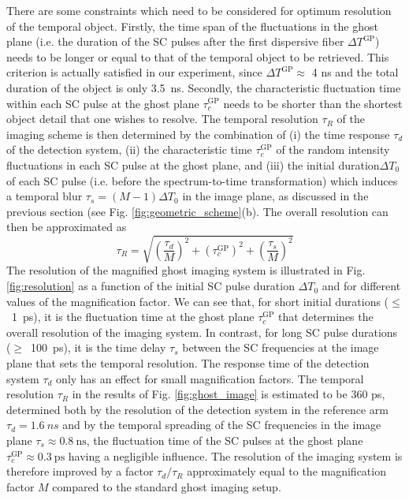 \documentclass[aip,graphicx]{revtex4-1}
\begin{document}
There are some constraints which need to be considered for optimum resolution of the temporal object. Firstly, the time span of the fluctuations in the ghost plane (i.e. the duration of the SC pulses after the first dispersive fiber $\Delta T^{\text{GP}}$) needs to be longer or equal to that of the temporal object to be retrieved. This criterion is actually satisfied in our experiment, since $\Delta T^{\text{GP}}\approx$ 4 ns and the total duration of the object is only 3.5~ns. Secondly, the characteristic fluctuation time within each SC pulse at the ghost plane $\tau_c^{\text{GP}}$ needs to be shorter than the shortest object detail that one wishes to resolve. The temporal resolution $\tau_R$ of the imaging scheme is then determined by the combination of (i) the time response $\tau_d$ of the detection system, (ii) the characteristic time $\tau_c^{\text{GP}}$  of the random intensity fluctuations in each SC pulse at the ghost plane, and (iii) the initial duration$\Delta T_0$ of each SC pulse (i.e. before the spectrum-to-time transformation) which induces a temporal blur $\tau_s =(M-1)\Delta T_0$ in the image plane, as discussed in the previous section (see Fig. \ref{fig:geometric_scheme}(b). The overall resolution can then be approximated as
\begin{equation}
\tau_R = \sqrt{\left( \frac{\tau_d}{M} \right )^2 +\left(\tau_c^{\text{GP}} \right )^2+\left(\frac{\tau_s}{M} \right )^2}
\end{equation}
The resolution of the magnified ghost imaging system is illustrated in Fig. \ref{fig:resolution} as a function of the initial SC pulse duration $\Delta T_0$ and for different values of the magnification factor. We can see that, for short initial durations {($\leq$~1~ps)}, it is the fluctuation time at the ghost plane $\tau_c^{\text{GP}}$  that determines the overall resolution of the imaging system. In contrast, for long SC pulse durations {($\geq$~100~ps)}, it is the time delay $\tau_s$ between the SC frequencies at the image plane that sets the temporal resolution. The response time of the detection system $\tau_d$ only has an effect for small magnification factors. The temporal resolution $\tau_R$ in the results of Fig. \ref{fig:ghost_image} is estimated to be 360 ps, determined both by the resolution of the detection system in the reference arm $\tau_d = 1.6 ~ns$ and by the temporal spreading of the SC frequencies in the image plane $\tau_s\approx 0.8 ~ \text{ns}$, the fluctuation time of the SC pulses at the ghost plane $\tau_c^{\text{GP}}\approx  0.3 ~\text{ps}$ having a negligible influence. The resolution of the imaging system is therefore improved by a factor $\tau_d/\tau_R$ approximately equal to the magnification factor $M$ compared to the standard ghost imaging setup.
\end{document}
